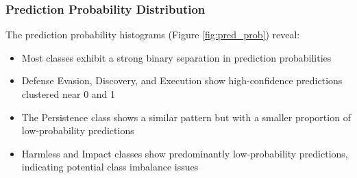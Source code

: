         \subsubsection{Prediction Probability Distribution}

            The prediction probability histograms (Figure \ref{fig:pred_prob}) reveal:

            \begin{itemize}
                \item Most classes exhibit a strong binary separation in prediction probabilities
                \item Defense Evasion, Discovery, and Execution show high-confidence predictions clustered near 0 and 1
                \item The Persistence class shows a similar pattern but with a smaller proportion of low-probability predictions
                \item Harmless and Impact classes show predominantly low-probability predictions, indicating potential class imbalance issues
            \end{itemize}
            
